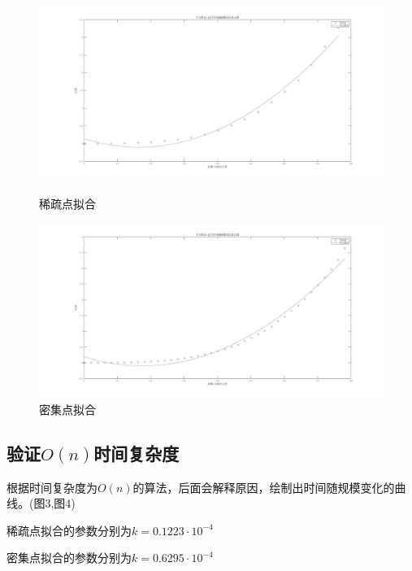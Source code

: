 \documentclass[UTF8]{ctexart}
\begin{document}
\begin{figure}[H] %
	\centering
	\begin{minipage}[t]{1\textwidth}
		\centering
		\includegraphics[width=12cm]{1.jpg}
		\caption{稀疏点拟合}
	\end{minipage}
	\begin{minipage}[t]{1\textwidth}
		\centering
		\includegraphics[width=12cm]{2.jpg}
		\caption{密集点拟合}
	\end{minipage}
\end{figure}

\subsection{验证\( O(n) \)时间复杂度}
根据时间复杂度为\( O(n) \)的算法，后面会解释原因，绘制出时间随规模变化的曲线。(图3,图4)

稀疏点拟合的参数分别为\(k=0.1223 \cdot 10^{-4}\)

密集点拟合的参数分别为\(k=0.6295 \cdot 10^{-4}\)
\end{document}
